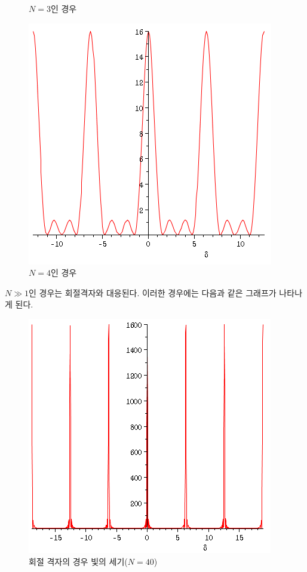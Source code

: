 \begin{figure}[!htb]
  \caption{$N=3$인 경우}\label{fig:awesome_image2}
\endminipage\hfill
{}%
  \includegraphics[width=\linewidth]{Pictures/n=4.PNG}
  \caption{$N=4$인 경우}\label{fig:awesome_image3}
\endminipage
\end{figure}
$N\gg 1$인 경우는 회절격자와 대응된다. 이러한 경우에는 다음과 같은 그래프가 나타나게 된다. 
\begin{figure}[h]
\centering\includegraphics[scale=0.5]{Pictures/n=20.PNG}
\caption{회절 격자의 경우 빛의 세기($N=40$)}
\label{fig:diffgrating}
\end{figure}
